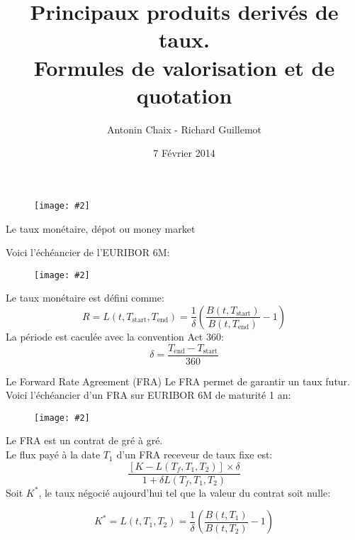 \documentclass{beamer}
\title[Pdts dérivés de taux]{Principaux produits derivés de taux. \\ Formules de valorisation et de quotation}
\author{Antonin Chaix - Richard Guillemot}
\institute{Master IFMA}
\date{7 Février 2014}
\newcommand{\FIG}[2]{\texttt{[image: \#2]}}
\begin{document}
\begin{frame}
\titlepage
\begin{figure}[h]
\centering \FIG{5cm}{figures/UPMC_IFMA.jpg}
\end{figure}

\end{frame}

\begin{frame}{Le taux monétaire, dépot ou money market}

Voici l'échéancier de l'EURIBOR 6M:
\begin{figure}[h]
\vspace{2mm}
\FIG{7cm}{figures/schema_euribor.jpg} 
\vspace{1mm}
\end{figure}
Le taux monétaire est défini comme:
\[
R=L(t,T_\text{start}, T_\text{end})=\frac{1}{\delta}\left(\frac{B(t,T_\text{start})}{B(t,T_\text{end})}-1\right)
\]
La période est caculée avec la convention Act 360:
\[
\delta = \frac{T_\text{end} - T_\text{start}} {360}
\]
\end{frame}

\begin{frame}{Le Forward Rate Agreement (FRA)}
Le FRA permet de garantir un taux futur.\\
Voici l'échéancier d'un FRA sur EURIBOR 6M de maturité 1 an:
\begin{figure}[h]
\FIG{7cm}{figures/schema_fra.jpg} 
\end{figure}
Le FRA est un contrat de gré à gré.\\
Le flux payé à la date $T_1$ d'un FRA receveur de taux fixe est:
\[
\frac{[K-L(T_f,T_1,T_2)]\times\delta}{1+\delta L(T_f,T_1,T_2)}
\]
Soit $K^*$, le taux négocié aujourd'hui tel que la valeur du contrat soit nulle:

\[
K^*=L(t,T_1, T_2)=\frac{1}{\delta}\left(\frac{B(t,T_1)}{B(t,T_2)}-1\right)
\]
\end{frame}
\end{document}
